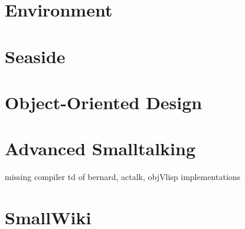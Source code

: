 \part{Environment}


\part{Seaside}




\part{Object-Oriented Design}







\part{Advanced Smalltalking}
missing compiler td of bernard, actalk, objVlisp implementations




\part{SmallWiki}



